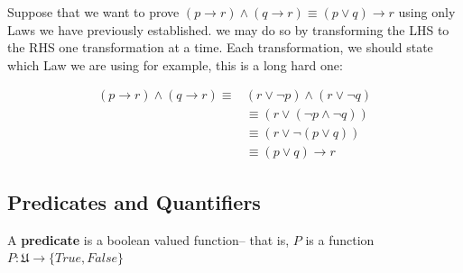 \newpage
\begin{exmp}
Suppose that we want to prove $(p \to r) \land (q \to r) \equiv (p \lor q) \to r$ using only Laws we have previously established.
we may do so by transforming the LHS to the RHS one transformation at a time. Each transformation, we should state which Law we are using for example, this is a long hard one:

\begin{align*}
(p \to r) \land (q \to r) \equiv& (r \lor \lnot p) \land (r\lor \lnot q)\\
&\equiv (r \lor (\lnot p \land \lnot q))\\
&\equiv (r \lor \lnot (p \lor q))\\
&\equiv (p \lor q) \to r
\end{align*}
\end{exmp}

\newpage 
\subsection{Predicates and Quantifiers}

\begin{defn}[predicate]
A \textbf{predicate} is a boolean valued function-- that is, $P$ is a function $P: \mathfrak{U} \to \{True,False\}$
\end{defn}

